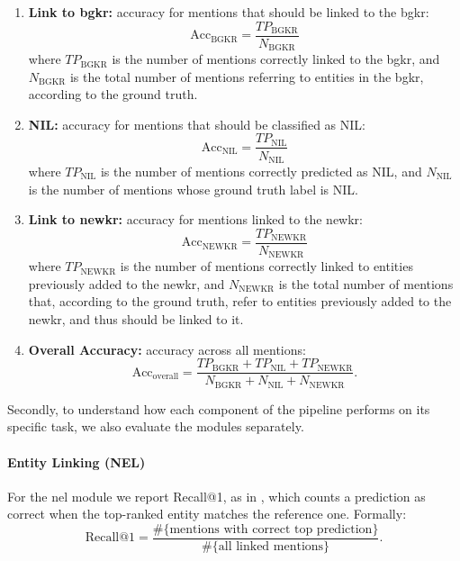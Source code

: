 \begin{enumerate}[leftmargin=*, label=(\alph*), ref=(\alph*)]

\item \textbf{Link to \ac{bgkr}:} accuracy for mentions that should be linked to the \acl{bgkr}:
\begin{equation}
\text{Acc}_{\text{BGKR}} =
\frac{TP_{\text{BGKR}}}{N_{\text{BGKR}}}
\end{equation}
where $TP_{\text{BGKR}}$ is the number of mentions correctly linked to the \ac{bgkr}, 
and $N_{\text{BGKR}}$ is the total number of mentions referring to entities in the \ac{bgkr}, according to the ground truth.

\item \textbf{NIL:} accuracy for mentions that should be classified as NIL:
\begin{equation}
\text{Acc}_{\text{NIL}} =
\frac{TP_{\text{NIL}}}{N_{\text{NIL}}}
\end{equation}
where $TP_{\text{NIL}}$ is the number of mentions correctly predicted as NIL, 
and $N_{\text{NIL}}$ is the number of mentions whose ground truth label is NIL.

\item \textbf{Link to \ac{newkr}:} accuracy for mentions linked to the \ac{newkr}:
\begin{equation}
\text{Acc}_{\text{NEWKR}} =
\frac{TP_{\text{NEWKR}}}{N_{\text{NEWKR}}}
\end{equation}
where $TP_{\text{NEWKR}}$ is the number of mentions correctly linked to entities previously added to the \ac{newkr},
and $N_{\text{NEWKR}}$ is the total number of mentions that, according to the ground truth, refer to entities previously added to the \ac{newkr}, and thus should be linked to it.


\item \textbf{Overall Accuracy:} accuracy across all mentions:
\begin{equation}
\text{Acc}_{\text{overall}} =
\frac{TP_{\text{BGKR}} + TP_{\text{NIL}} + TP_{\text{NEWKR}}}
     {N_{\text{BGKR}} + N_{\text{NIL}} + N_{\text{NEWKR}}}.
\end{equation}

\end{enumerate}

\medskip\noindent
Secondly, to understand how each component of the pipeline performs on its specific task, 
we also evaluate the modules separately.

\paragraph{Entity Linking (NEL)}
For the \ac{nel} module we report Recall@1, as in \textcite{blink}, which 
counts a prediction as correct when the top-ranked entity matches the reference one. Formally:
\begin{equation}
\text{Recall@1} = 
\frac{\#\{\text{mentions with correct top prediction}\}}
     {\#\{\text{all linked mentions}\}}.
\end{equation}

